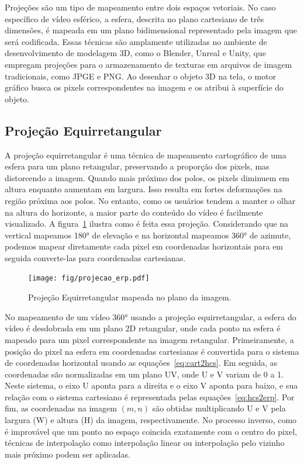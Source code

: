 Projeções são um tipo de mapeamento entre dois espaços vetoriais. No caso específico de vídeo esférico, a esfera, descrita no plano cartesiano de três dimensões, é mapeada em um plano bidimensional representado pela imagem que será codificada. Essas técnicas são amplamente utilizadas no ambiente de desenvolvimento de modelagem 3D, como o Blender, Unreal e Unity, que empregam projeções para o armazenamento de texturas em arquivos de imagem tradicionais, como JPGE e PNG. Ao desenhar o objeto 3D na tela, o motor gráfico busca os pixels correspondentes na imagem e os atribui à superfície do objeto.

\subsection{Projeção Equirretangular}

A projeção equirretangular é uma técnica de mapeamento cartográfico de uma esfera para um plano retangular, preservando a proporção dos pixels, mas distorcendo a imagem. Quando mais próximo dos polos, os pixels diminuem em altura enquanto aumentam em largura. Isso resulta em fortes deformações na região próxima aos polos. No entanto, como os usuários tendem a manter o olhar na altura do horizonte, a maior parte do conteúdo do vídeo é facilmente visualizado. A figura~\ref{fig:erp} ilustra como é feita essa projeção. Considerando que na vertical mapeamos 180° de elevação e na horizontal mapeamos 360° de azimute, podemos mapear diretamente cada pixel em coordenadas horizontais para em seguida converte-las para coordenadas cartesianas.

\begin{figure}[h]
	\centering
	\texttt{[image: fig/projecao\_erp.pdf]}
	\caption{Projeção Equirretangular mapeada no plano da imagem.}
	\label{fig:erp}
\end{figure}

No mapeamento de um vídeo 360° usando a projeção equirretangular, a esfera do vídeo é desdobrada em um plano 2D retangular, onde cada ponto na esfera é mapeado para um pixel correspondente na imagem retangular. Primeiramente, a posição do pixel na esfera em coordenadas cartesianas é convertida para o sistema de coordenadas horizontal usando as equações~\ref{eq:cart2hcs}. Em seguida, as coordenadas são normalizadas em um plano UV, onde U e V variam de 0 a 1. Neste sistema, o eixo U aponta para a direita e o eixo V aponta para baixo, e sua relação com o sistema cartesiano é representada pelas equações~\ref{eq:hcs2erp}. Por fim, as coordenadas na imagem $(m, n)$ são obtidas multiplicando U e V pela largura (W) e altura (H) da imagem, respectivamente. No processo inverso, como é improvável que um ponto no espaço coincida exatamente com o centro do pixel, técnicas de interpolação como interpolação linear ou interpolação pelo vizinho mais próximo podem ser aplicadas.

